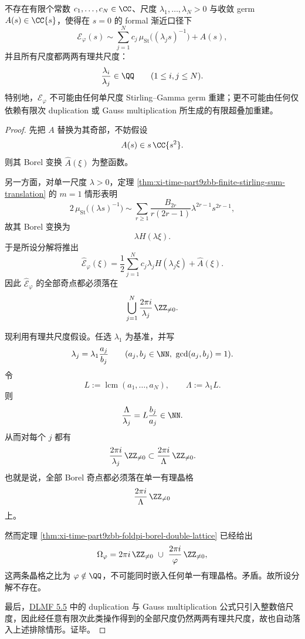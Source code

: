 \begin{theorem}\label{thm:xi-time-part9zbb-no-rational-coscale-stirling-collapse}
不存在有限个常数 \(c_1,\dots,c_N\in\CC\)、尺度 \(\lambda_1,\dots,\lambda_N>0\) 与收敛 germ \(A(s)\in\CC\{s\}\)，使得在 \(s=0\) 的 formal 渐近口径下
\[
\mathcal E_\varphi(s)
\sim
\sum_{j=1}^{N}c_j\,\mu_{\mathrm{St}}\!\bigl((\lambda_j s)^{-1}\bigr)
+A(s),
\]
并且所有尺度都两两有理共尺度：
\[
\frac{\lambda_i}{\lambda_j}\in\QQ
\qquad (1\le i,j\le N).
\]
特别地，\(\mathcal E_\varphi\) 不可能由任何单尺度 Stirling--Gamma germ 重建；更不可能由任何仅依赖有限次 duplication 或 Gauss multiplication 所生成的有限超叠加重建。
\end{theorem}
\begin{proof}
先把 \(A\) 替换为其奇部，不妨假设
\[
A(s)\in s\,\CC\{s^2\}.
\]
则其 Borel 变换 \(\widehat A(\xi)\) 为整函数。

另一方面，对单一尺度 \(\lambda>0\)，定理
\ref{thm:xi-time-part9zbb-finite-stirling-sum-translation} 的 \(m=1\) 情形表明
\[
2\,\mu_{\mathrm{St}}\!\bigl((\lambda s)^{-1}\bigr)
\sim
\sum_{r\ge 1}\frac{B_{2r}}{r(2r-1)}\lambda^{2r-1}s^{2r-1},
\]
故其 Borel 变换为
\[
\lambda H(\lambda\xi).
\]
于是所设分解将推出
\[
\widehat{\mathcal E}_\varphi(\xi)
=
\frac12\sum_{j=1}^{N}c_j\lambda_j H(\lambda_j\xi)+\widehat A(\xi).
\]
因此 \(\widehat{\mathcal E}_\varphi\) 的全部奇点都必须落在
\[
\bigcup_{j=1}^{N}\frac{2\pi i}{\lambda_j}\,\ZZ_{\neq 0}.
\]

现利用有理共尺度假设。任选 \(\lambda_1\) 为基准，并写
\[
\lambda_j=\lambda_1\frac{a_j}{b_j}
\qquad (a_j,b_j\in\NN,\ \gcd(a_j,b_j)=1).
\]
令
\[
L:=\operatorname{lcm}(a_1,\dots,a_N),
\qquad
\Lambda:=\lambda_1 L.
\]
则
\[
\frac{\Lambda}{\lambda_j}=L\frac{b_j}{a_j}\in\NN.
\]
从而对每个 \(j\) 都有
\[
\frac{2\pi i}{\lambda_j}\,\ZZ_{\neq 0}
\subset
\frac{2\pi i}{\Lambda}\,\ZZ_{\neq 0}.
\]
也就是说，全部 Borel 奇点都必须落在单一有理晶格
\[
\frac{2\pi i}{\Lambda}\,\ZZ_{\neq 0}
\]
上。

然而定理 \ref{thm:xi-time-part9zbb-foldpi-borel-double-lattice} 已经给出
\[
\Omega_\varphi=
2\pi i\,\ZZ_{\neq 0}
\ \cup\
\frac{2\pi i}{\varphi}\,\ZZ_{\neq 0},
\]
这两条晶格之比为 \(\varphi\notin\QQ\)，不可能同时嵌入任何单一有理晶格。矛盾。故所设分解不存在。

最后，\href{https://dlmf.nist.gov/5.5}{DLMF 5.5} 中的 duplication 与 Gauss multiplication 公式只引入整数倍尺度，因此经任意有限次此类操作得到的全部尺度仍然两两有理共尺度，故也自动落入上述排除情形。证毕。
\end{proof}

